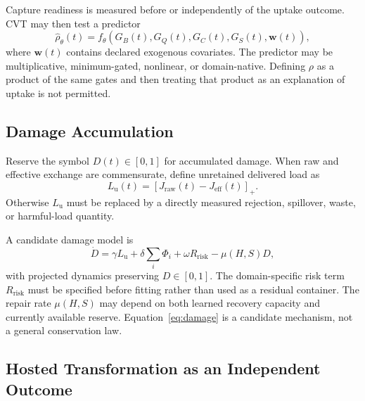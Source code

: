 Capture readiness is measured before or independently of the uptake outcome. CVT may then test a predictor
\begin{equation}
    \widehat{\rho}_{\theta}(t)
    =
    f_{\theta}\!\left(
        G_B(t),G_Q(t),G_C(t),G_S(t),\mathbf w(t)
    \right),
    \label{eq:uptake-predictor}
\end{equation}
where \(\mathbf w(t)\) contains declared exogenous covariates. The predictor may be multiplicative, minimum-gated, nonlinear, or domain-native. Defining \(\rho\) as a product of the same gates and then treating that product as an explanation of uptake is not permitted.

\subsection{Damage Accumulation}

Reserve the symbol \(D(t)\in[0,1]\) for accumulated damage. When raw and effective exchange are commensurate, define unretained delivered load as
\begin{equation}
    L_{\mathrm{u}}(t)
    =
    [J_{\mathrm{raw}}(t)-J_{\mathrm{eff}}(t)]_+.
    \label{eq:unretained-load}
\end{equation}
Otherwise \(L_{\mathrm{u}}\) must be replaced by a directly measured rejection, spillover, waste, or harmful-load quantity.

A candidate damage model is
\begin{equation}
    \dot D
    =
    \gamma L_{\mathrm{u}}
    +
    \delta\sum_i\Phi_i
    +
    \omega R_{\mathrm{risk}}
    -
    \mu(H,S)D,
    \label{eq:damage}
\end{equation}
with projected dynamics preserving \(D\in[0,1]\). The domain-specific risk term \(R_{\mathrm{risk}}\) must be specified before fitting rather than used as a residual container. The repair rate \(\mu(H,S)\) may depend on both learned recovery capacity and currently available reserve. Equation~\eqref{eq:damage} is a candidate mechanism, not a general conservation law.

\subsection{Hosted Transformation as an Independent Outcome}

